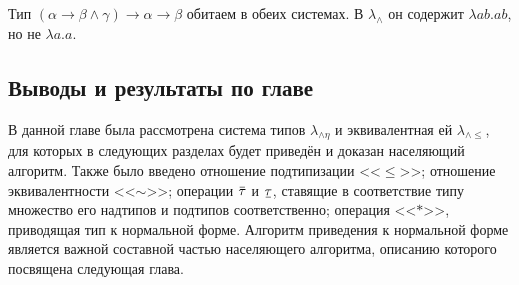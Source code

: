 \documentclass[../main.tex]{subfiles}
\begin{document}
\begin{notice}
    Тип  $(\alpha \to \beta \wedge \gamma) \to \alpha \to \beta$ обитаем в обеих системах. В $\lambda_{\wedge}$ он содержит $\lambda a b . a b$, но не $\lambda a . a$.
\end{notice}

\subsection{Выводы и результаты по главе}

В данной главе была рассмотрена система типов $\lambda_{\wedge \eta}$ и эквивалентная ей $\lambda_{\wedge \leqslant}$, для которых в следующих разделах будет приведён и доказан населяющий алгоритм. Также было введено отношение подтипизации <<$\leqslant$>>; отношение эквивалентности <<$\sim$>>; операции $\ob{\tau}$ и $\ub{\tau}$, ставящие в соответствие типу множество его надтипов и подтипов соответственно;  операция <<$*$>>, приводящая тип к нормальной форме. Алгоритм приведения к нормальной форме является важной составной частью населяющего алгоритма, описанию которого посвящена следующая глава.
\end{document}
